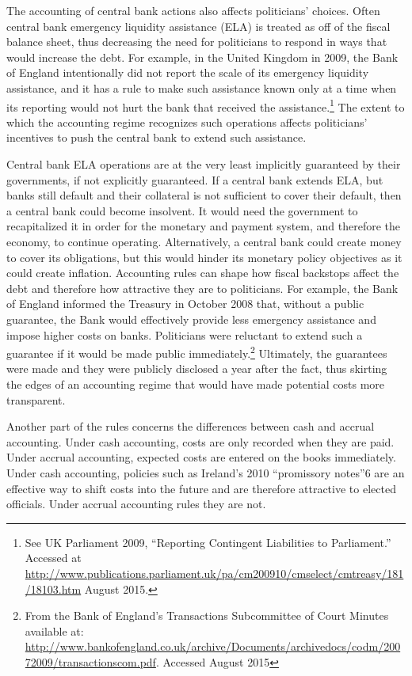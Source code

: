 \documentclass[]{article}
\begin{document}

The accounting of central bank actions also affects politicians' choices. Often central bank emergency liquidity assistance (ELA) is treated as off of the fiscal balance sheet, thus decreasing the need for politicians to respond in ways that would increase the debt. For example, in the United Kingdom in 2009, the Bank of England intentionally did not report the scale of its emergency liquidity assistance, and it has a rule to make such assistance known only at a time when its reporting would not hurt the bank that received the assistance.\footnote{See UK Parliament 2009, ``Reporting Contingent Liabilities to Parliament.'' Accessed at \url{http://www.publications.parliament.uk/pa/cm200910/cmselect/cmtreasy/181/18103.htm} August 2015.} The extent to which the accounting regime recognizes such operations affects politicians' incentives to push the central bank to extend such assistance.

Central bank ELA operations are at the very least implicitly guaranteed by their governments, if not explicitly guaranteed. If
a central bank extends ELA, but banks still default and their collateral is not sufficient to cover their default, then a central bank could become insolvent. It would need the government to recapitalized it in order for the monetary and payment system, and therefore the economy, to continue operating. Alternatively, a central bank could create money to cover its obligations, but this would hinder its monetary policy objectives as it could create inflation. Accounting rules can shape how fiscal backstops affect the debt and therefore how attractive they are to politicians. For example, the Bank of England informed the Treasury in October 2008 that, without a public guarantee, the Bank would effectively provide less emergency assistance and impose higher costs on banks. Politicians were reluctant to extend such a guarantee if it would be made public immediately.\footnote{From the Bank of England’s Transactions Sub­committee of Court Minutes available
 at: \url{http://www.bankofengland.co.uk/archive/Documents/archivedocs/codm/20072009/transactionscom.pdf}. Accessed August 2015}
 Ultimately, the guarantees were made and they were publicly disclosed a year after the fact, thus skirting the edges of an accounting regime that would have made potential costs more transparent.

Another part of the rules concerns the differences between cash and accrual accounting. Under cash accounting, costs are only recorded when they are paid. Under accrual accounting, expected costs are entered on the books immediately. Under cash accounting, policies such as Ireland’s 2010 “promissory notes”6 are an effective way to shift costs into the future and are therefore attractive to elected officials. Under accrual accounting rules they are not.
\end{document}
